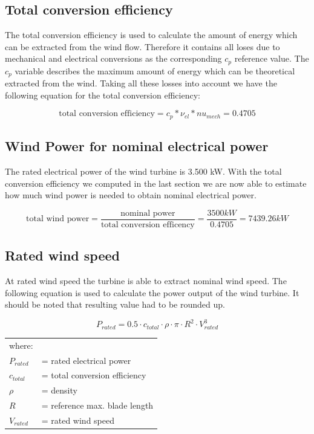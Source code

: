 \documentclass[10pt]{article}
\begin{document}
\subsection{Total conversion efficiency}
The total conversion efficiency is used to calculate the amount of energy which can be extracted from the wind flow. Therefore it contains all loses due to mechanical and electrical conversions as the corresponding $c_p$ reference value. The $c_p$ variable describes the maximum amount of energy which can be theoretical extracted from the wind.
Taking all these losses into account we have the following equation for the total conversion efficiency:

\begin{equation}
\text{total conversion efficiency} = c_p * \nu_{el} * nu_{mech} = 	0.4705
\end{equation}

\subsection{Wind Power for nominal electrical power}
The rated electrical power of the wind turbine is 3.500 kW. With the total conversion efficiency we computed in the last section we are now able to estimate how much wind power is needed to obtain nominal electrical power.

\begin{equation}
\text{total wind power} = \frac{\text{nominal power}}{\text{total conversion efficency}} = \frac{3500 kW}{0.4705} = 7439.26 kW
\end{equation}

\subsection{Rated wind speed}
At rated wind speed the turbine is able to extract nominal wind speed. The following equation is used to calculate the power output of the wind turbine. It should be noted that resulting value had to be rounded up. 

\begin{equation}
P_{rated} = 0.5 \cdot c_{total} \cdot \rho \cdot \pi \cdot R^2 \cdot V_{rated}^3
\end{equation}

\begin{tabular}{l l}
where:&\\
$P_{rated}$ &= rated electrical power\\
$c_{total}$ &= total conversion efficiency\\
$\rho$ &= density\\
$R$ &= reference max. blade length\\
$V_{rated}$& = rated wind speed\\
\end{tabular}
\end{document}
